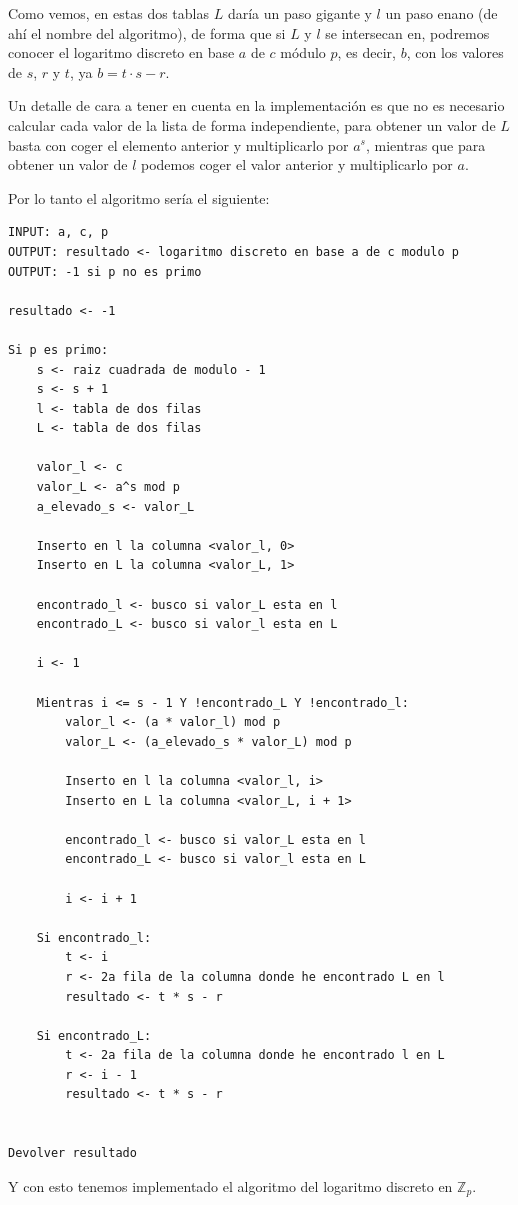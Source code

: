 \documentclass[12pt, spanish]{article}
\begin{document}
Como vemos, en estas dos tablas $L$ daría un paso gigante y $l$ un paso enano (de ahí el nombre del algoritmo), de forma que si $L$ y $l$ se intersecan en, podremos conocer el logaritmo discreto en base $a$ de $c$ módulo $p$, es decir, $b$, con los valores de $s$, $r$ y $t$, ya $b = t \cdot s - r$.

Un detalle de cara a tener en cuenta en la implementación es que no es necesario calcular cada valor de la lista de forma independiente, para obtener un valor de $L$ basta con coger el elemento anterior y multiplicarlo por $a^s$, mientras que para obtener un valor de $l$ podemos coger el valor anterior y multiplicarlo por $a$.

Por lo tanto el algoritmo sería el siguiente:

\begin{lstlisting}[caption={Algoritmo paso enano paso gigante}]
INPUT: a, c, p
OUTPUT: resultado <- logaritmo discreto en base a de c modulo p
OUTPUT: -1 si p no es primo

resultado <- -1

Si p es primo:
	s <- raiz cuadrada de modulo - 1
	s <- s + 1
	l <- tabla de dos filas
	L <- tabla de dos filas

	valor_l <- c
	valor_L <- a^s mod p
	a_elevado_s <- valor_L

	Inserto en l la columna <valor_l, 0>
	Inserto en L la columna <valor_L, 1>

	encontrado_l <- busco si valor_L esta en l
	encontrado_L <- busco si valor_l esta en L

	i <- 1

	Mientras i <= s - 1 Y !encontrado_L Y !encontrado_l:
		valor_l <- (a * valor_l) mod p
		valor_L <- (a_elevado_s * valor_L) mod p

		Inserto en l la columna <valor_l, i>
		Inserto en L la columna <valor_L, i + 1>

		encontrado_l <- busco si valor_L esta en l
		encontrado_L <- busco si valor_l esta en L

		i <- i + 1

	Si encontrado_l:
		t <- i
		r <- 2a fila de la columna donde he encontrado L en l
		resultado <- t * s - r

	Si encontrado_L:
		t <- 2a fila de la columna donde he encontrado l en L
		r <- i - 1
		resultado <- t * s - r


Devolver resultado
\end{lstlisting}

Y con esto tenemos implementado el algoritmo del logaritmo discreto en $\mathbb{Z}_p$.
\end{document}
